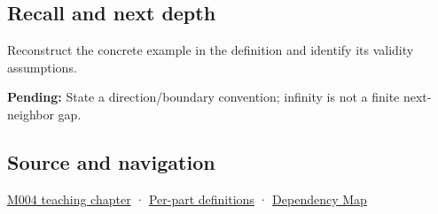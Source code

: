 \subsection{Recall and next depth}\label{appendix-14bab4cab9d4-recall-and-next-depth}

Reconstruct the concrete example in the definition and identify its validity assumptions.

\textbf{Pending:} State a direction/boundary convention; infinity is not a finite next-neighbor gap.

\subsection{Source and navigation}\label{appendix-14bab4cab9d4-source-and-navigation}

\hyperref[01-foundations-i-ch001-a-stretching-ruler-for-real-valued-quantities]{M004 teaching chapter} · \hyperref[appendix-fd090d982a15-m004---parts-61-76]{Per-part definitions} · \hyperref[appendix-4ad47bdd269a]{Dependency Map}
